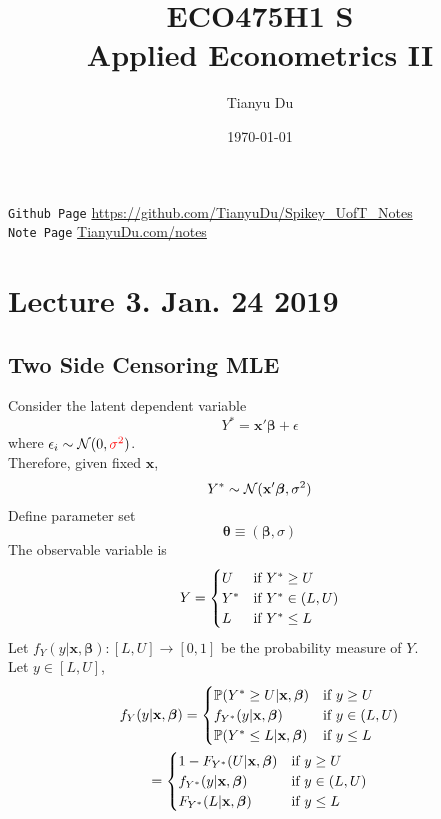 \documentclass[11pt]{article}
\title{ECO475H1 S\\ Applied Econometrics II}
\author{Tianyu Du}
\date{\today}
\newcommand{\red}[1]{\textcolor{red}{#1}}
\newcommand{\bm}[1]{\boldsymbol{#1}}
\begin{document}
	\maketitle
	\doclicenseThis
	\texttt{Github Page} \url{https://github.com/TianyuDu/Spikey_UofT_Notes}\\
	\texttt{Note Page} \url{TianyuDu.com/notes}
	
	\tableofcontents
	\newpage
	
	\section{Lecture 3. Jan. 24 2019}
		\subsection{Two Side Censoring MLE}
		\par Consider the latent dependent variable
		\begin{equation}
			Y^* = \textbf{x}' \bm{\beta} + \epsilon
		\end{equation}
		where $\epsilon_i \sim \mc{N}(0, \red{\sigma^2})$. \\
		Therefore, given fixed $\textbf{x}$,
		\begin{equation}
			Y^* \sim \mc{N}(\textbf{x}' \bm{\beta}, \sigma^2)
		\end{equation}
		Define parameter set 
		\begin{equation}
			\bm{\theta} \equiv (\bm{\beta}, \sigma)
		\end{equation}
		The observable variable is 
		\begin{gather}
			Y = \begin{cases}
				U &\text{{if }} Y^* \geq U \\
				Y^* &\text{{if }} Y^* \in (L, U) \\
				L &\text{{if }} Y^* \leq L
			\end{cases}
		\end{gather}
		Let $f_Y(y|\textbf{x}, \bm{\beta}): [L, U] \to [0, 1]$ be the probability measure of $Y$. \\
		Let $y \in [L, U]$, 
		\begin{gather}
			f_Y(y|\textbf{x}, \bm{\beta}) = \begin{cases}
				\mathbb{P}(Y^* \geq U|\textbf{x}, \bm{\beta}) &\tx{if } y \geq U \\
				f_{Y^*}(y|\textbf{x}, \bm{\beta}) &\tx{if } y \in (L, U) \\
				\mathbb{P}(Y^* \leq L|\textbf{x}, \bm{\beta}) &\tx{if } y \leq L
			\end{cases} \\
			= \begin{cases}
				1 - F_{Y^*}(U|\textbf{x}, \bm{\beta}) &\tx{if } y \geq U \\
				f_{Y^*}(y|\textbf{x}, \bm{\beta}) &\tx{if } y \in (L, U) \\
				F_{Y^*}(L|\textbf{x}, \bm{\beta}) &\tx{if } y \leq L
			\end{cases}
		\end{gather}
\end{document}
